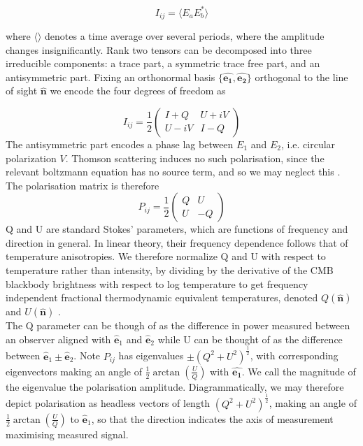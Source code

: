 \documentclass[a4paper,10pt]{article}
\renewcommand{\v}[1]{\mathbf{#1}}
\newcommand{\half}{\frac{1}{2}}
\newcommand{\unit}[1]{\hat{\v{#1}}}
\begin{document}
\begin{equation}
I_{ij} = \langle E_aE_b^* \rangle
\end{equation}

where $\langle\rangle$ denotes a time average over several periods, where the amplitude changes insignificantly. Rank two tensors can be decomposed into three irreducible components: a trace part, a symmetric trace free part, and an antisymmetric part.  Fixing an orthonormal basis $\{\unit{e_1},\unit{e_2}\}$ orthogonal to the line of sight $\unit{n}$ we encode the four degrees of freedom as 


\begin{equation}
I_{ij} =
\half\begin{pmatrix}
I+Q & U+iV\\ 
U-iV & I-Q
\end{pmatrix}
\end{equation}
The antisymmetric part encodes a phase lag between $E_1$ and $E_2$, i.e. circular polarization $V$. Thomson scattering induces no such polarisation, since the relevant boltzmann equation has no source term, and so we may neglect this \cite{kowosky}. The polarisation matrix is therefore 
\begin{equation}
P_{ij} =\half \begin{pmatrix}
Q & U\\ 
U & -Q
\end{pmatrix}
\end{equation}
Q and U are standard Stokes' parameters, which are functions of frequency and direction in general. In linear theory, their frequency dependence follows that of temperature anisotropies. We therefore normalize Q and U with respect to temperature rather than intensity, by dividing by the derivative of the CMB blackbody brightness with respect to log temperature to get frequency independent fractional thermodynamic equivalent temperatures, denoted $Q(\unit{n})$ and $U(\unit{n})$ \cite{notes}. \\

The Q parameter can be though of as the difference in power measured between an observer aligned with $\unit{e}_1$ and $\unit{e}_2$ while U can be thought of as the difference between $\unit{e}_1\pm\unit{e}_2$. Note $P_{ij}$ has eigenvalues $\pm (Q^2 + U^2)^\half$, with corresponding eigenvectors making an angle of $\half\arctan(\frac{U}{Q})$ with $\unit{e_1}$. We call the magnitude of the eigenvalue the polarisation amplitude. Diagrammatically, we may therefore depict polarisation as headless vectors of length $(Q^2 + U^2)^\half$, making an angle of $\half\arctan(\frac{U}{Q})$ to $\unit{e}_1$, so that the direction indicates the axis of measurement maximising measured signal.\\
\end{document}
